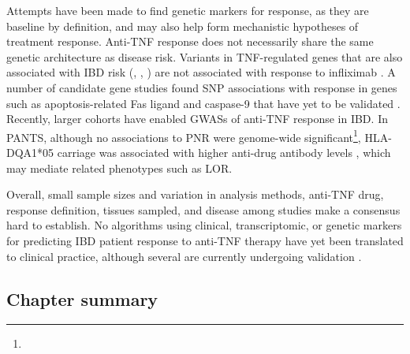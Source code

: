 Attempts have been made to find genetic markers for response,
as they are baseline by definition, and may also help form mechanistic hypotheses of treatment response.
Anti-\gls{TNF} response does not necessarily share the same genetic architecture as disease risk.
Variants in \gls{TNF}-regulated genes that are also associated with \gls{IBD} risk (, , ) are not associated with response to infliximab \autocite{digby-bell2019InterrogatingHostImmunity,noor2020PersonalisedMedicineCrohn}.
A number of candidate gene studies found \gls{SNP} associations with response in genes such as apoptosis-related Fas ligand and caspase-9 that have yet to be validated \autocite{flamant2018InflammatoryBowelDisease,burke2018GeneticMarkersPredict}.
Recently, larger cohorts have enabled \glspl{GWAS} of anti-\gls{TNF} response in \gls{IBD}.
In \gls{PANTS}, although no associations to \gls{PNR} were genome-wide significant\footnote{},
HLA-DQA1*05 carriage was associated with higher anti-drug antibody levels \autocite{sazonovs2019HLADQA105Carriage}, which may mediate related phenotypes such as \gls{LOR}.

Overall, small sample sizes and variation in analysis methods, anti-\gls{TNF} drug, response definition, tissues sampled, and disease among studies make a consensus hard to establish.
No algorithms using clinical, transcriptomic, or genetic markers for predicting \gls{IBD} patient response to anti-\gls{TNF} therapy have yet been translated to clinical practice,
although several are currently undergoing validation \autocite{noor2020PersonalisedMedicineCrohn}.

\subsection{Chapter summary}

